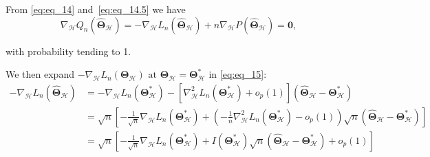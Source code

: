 \documentclass[12pt,letter]{article}\usepackage[]{graphicx}\usepackage[]{color}
\newcommand{\btheta}{\boldsymbol{\theta}}
\begin{document}

From \eqref{eq:eq_14} and~\eqref{eq:eq_14.5} we have
\begin{equation}
\nabla_{\mathcal{H}}Q_{n}\left(\widehat{\boldsymbol{\Theta}}_{\mathcal{H}}\right)=-\nabla_{\mathcal{H}}L_{n}\left(\widehat{\boldsymbol{\Theta}}_{\mathcal{H}}\right)+n\nabla_{\mathcal{H}}P\left(\widehat{\boldsymbol{\Theta}}_{\mathcal{H}}\right)=\mathbf{0},\label{eq:eq_15}
\end{equation}

with probability tending to 1. 

We then expand $-\nabla_{\mathcal{H}}L_{n}\left(\boldsymbol{\Theta}_{\mathcal{H}}\right)\text{ at }\boldsymbol{\Theta}_{\mathcal{H}}=\boldsymbol{\Theta}_{\mathcal{H}}^{*}$ in \eqref{eq:eq_15}:
\[
\begin{aligned}-\nabla_{\mathcal{H}}L_{n}\left(\widehat{\boldsymbol{\Theta}}_{\mathcal{H}}\right) & =-\nabla_{\mathcal{H}}L_{n}\left(\boldsymbol{\Theta}_{\mathcal{H}}^{*}\right)-\left[\nabla_{\mathcal{H}}^{2}L_{n}\left(\boldsymbol{\Theta}_{\mathcal{H}}^{*}\right)+o_{p}(1)\right]\left(\widehat{\boldsymbol{\Theta}}_{\mathcal{H}}-\boldsymbol{\Theta}_{\mathcal{H}}^{*}\right)\\
& =\sqrt{n}\left[-\frac{1}{\sqrt{n}}\nabla_{\mathcal{H}}L_{n}\left(\boldsymbol{\Theta}_{\mathcal{H}}^{*}\right)+\left(-\frac{1}{n}\nabla_{\mathcal{H}}^{2}L_{n}\left(\boldsymbol{\Theta}_{\mathcal{H}}^{*}\right)-o_{p}(1)\right)\sqrt{n}\left(\widehat{\boldsymbol{\Theta}}_{\mathcal{H}}-\boldsymbol{\Theta}_{\mathcal{H}}^{*}\right)\right]\\
& =\sqrt{n}\left[-\frac{1}{\sqrt{n}}\nabla_{\mathcal{H}}L_{n}\left(\boldsymbol{\Theta}_{\mathcal{H}}^{*}\right)+I\left(\boldsymbol{\Theta}_{\mathcal{H}}^{*}\right)\sqrt{n}\left(\widehat{\boldsymbol{\Theta}}_{\mathcal{H}}-\boldsymbol{\Theta}_{\mathcal{H}}^{*}\right)+o_{p}(1)\right]
\end{aligned}
\]
\end{document}
